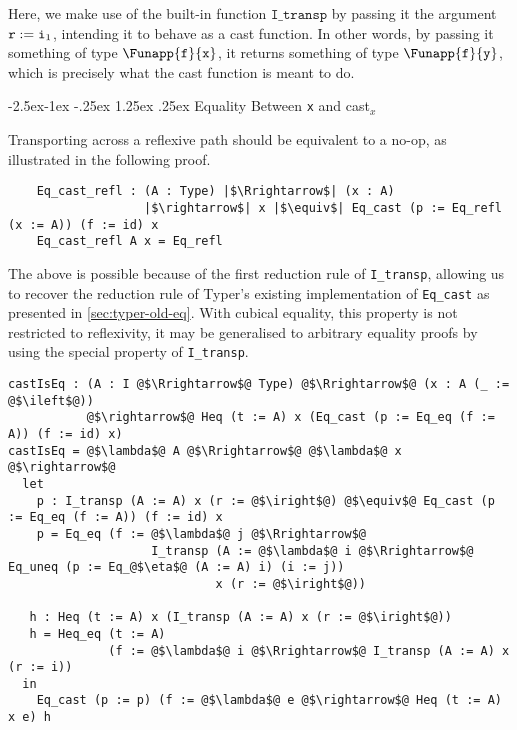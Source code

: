 \documentclass[12pt,twoside,maitrise]{dms}
\makeatletter
\theoremstyle{definition}
\numberwithin{equation}{section}
\numberwithin{table}{chapter}
\numberwithin{figure}{chapter}
\newcommand\kw[1] {\textsf{#1}}
\newcommand\id[1] {\texttt{#1}}
\renewcommand\paragraph{\@startsection{paragraph}{4}{\z@}%
            {-2.5ex\@plus -1ex \@minus -.25ex}%
            {1.25ex \@plus .25ex}%
            {\normalfont\normalsize\bfseries}}
\makeatother
\begin{document}
Here, we make use of the built-in function $\id{I\_transp}$ by passing it the
argument $\earg{\id{r}}{\iright}$, intending it to behave as a cast function. In
other words, by passing it something of type $\Funapp{\id{f}}{\id{x}}$, it
returns something of type $\Funapp{\id{f}}{\id{y}}$, which is precisely what the
cast function is meant to do.

\paragraph{Equality Between \id{x} and \kw{cast}$_x$}\label{app:cast-is-eq}

Transporting across a reflexive path should be equivalent to a no-op, as
illustrated in the following proof.

\begin{verbatim}
    Eq_cast_refl : (A : Type) |$\Rrightarrow$| (x : A)
                   |$\rightarrow$| x |$\equiv$| Eq_cast (p := Eq_refl (x := A)) (f := id) x
    Eq_cast_refl A x = Eq_refl
\end{verbatim}

The above is possible because of the first reduction rule of \id{I\_transp},
allowing us to recover the reduction rule of Typer's existing implementation of
\id{Eq\_cast} as presented in \autoref{sec:typer-old-eq}. With cubical equality,
this property is not restricted to reflexivity, it may be generalised to
arbitrary equality proofs by using the special property of \id{I\_transp}.

\begin{verbatim}
castIsEq : (A : I @$\Rrightarrow$@ Type) @$\Rrightarrow$@ (x : A (_ := @$\ileft$@))
           @$\rightarrow$@ Heq (t := A) x (Eq_cast (p := Eq_eq (f := A)) (f := id) x)
castIsEq = @$\lambda$@ A @$\Rrightarrow$@ @$\lambda$@ x @$\rightarrow$@
  let
    p : I_transp (A := A) x (r := @$\iright$@) @$\equiv$@ Eq_cast (p := Eq_eq (f := A)) (f := id) x
    p = Eq_eq (f := @$\lambda$@ j @$\Rrightarrow$@
                    I_transp (A := @$\lambda$@ i @$\Rrightarrow$@ Eq_uneq (p := Eq_@$\eta$@ (A := A) i) (i := j))
                             x (r := @$\iright$@))

   h : Heq (t := A) x (I_transp (A := A) x (r := @$\iright$@))
   h = Heq_eq (t := A)
              (f := @$\lambda$@ i @$\Rrightarrow$@ I_transp (A := A) x (r := i))
  in
    Eq_cast (p := p) (f := @$\lambda$@ e @$\rightarrow$@ Heq (t := A) x e) h
\end{verbatim}
\end{document}
